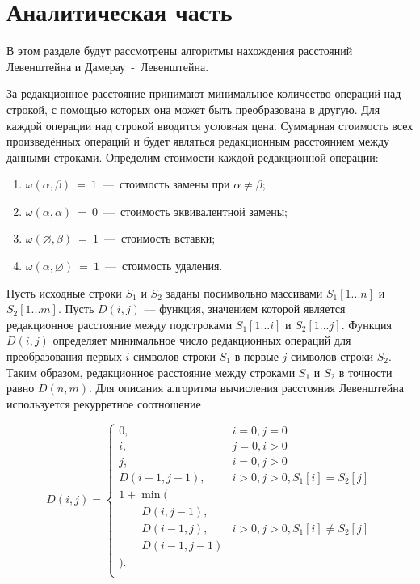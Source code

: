 \section{Аналитическая часть}

В этом разделе будут рассмотрены алгоритмы нахождения расстояний Левенштейна и Дамерау~-~Левенштейна. 
 
За редакционное расстояние принимают минимальное количество операций над строкой, с помощью которых она может быть преобразована в другую. Для каждой операции над строкой вводится условная цена. Суммарная стоимость всех произведённых операций и будет являться редакционным расстоянием между данными строками. Определим стоимости каждой редакционной операции:

\begin{enumerate}
	\item $\omega(\alpha,\beta)~=~1$~---~стоимость замены при $\alpha \neq \beta$;
	\item $\omega(\alpha,\alpha)~=~0$~---~стоимость эквивалентной замены;
	\item $\omega(\varnothing,\beta)~=~1$~---~стоимость вставки;
	\item $\omega(\alpha,\varnothing)~=~1$~---~стоимость удаления.
\end{enumerate}

Пусть исходные строки \(S_1\) и \(S_2\) заданы посимвольно массивами \(S_1[1...n]\) и \(S_2[1...m]\). Пусть \(D(i, j)\) --- функция, значением которой является редакционное расстояние между подстроками \(S_1[1...i]\) и \(S_2[1...j]\). Функция \(D(i, j)\) определяет минимальное число редакционных операций для преобразования первых \(i\) символов строки \(S_1\) в первые \(j\) символов строки \(S_2\). Таким образом, редакционное расстояние между строками \(S_1\) и \(S_2\) в точности равно  \(D(n, m)\). Для описания алгоритма вычисления расстояния Левенштейна используется рекурретное соотношение

\begin{equation}
\label{eq:lev_formula}
    D(i, j) = \begin{cases}
        0, & i = 0, j = 0\\
        i, & j = 0, i > 0\\
        j, & i = 0, j > 0\\
        D(i-1, j-1), & i > 0, j > 0, S_1[i] = S_2[j]\\
        1 + \min (\\
            \qquad D(i, j-1),\\
            \qquad D(i-1, j), & i > 0, j > 0, S_1[i] \neq S_2[j]\\
            \qquad D(i-1, j-1)\\
            ).\\
    \end{cases}
\end{equation}

